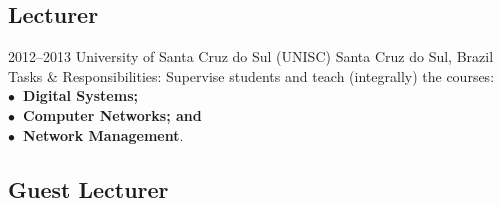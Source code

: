 \documentclass[print]{styles/friggeri-cv-mac} %
\begin{document}

\subsection{Lecturer}\vspace{-5pt}
\begin{entrylist}
\entry
{2012--2013}
{University of Santa Cruz do Sul (UNISC)}
{Santa Cruz do Sul, Brazil}
{Tasks \& Responsibilities: Supervise students and teach (integrally) the courses: \\
	\textbf{$\bullet$~Digital Systems;\\$\bullet$~Computer Networks; and\\$\bullet$~Network Management}.} 
\end{entrylist}

\newpage
\subsection{Guest Lecturer}\vspace{-5pt}

\end{document}
